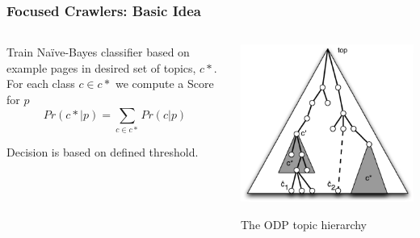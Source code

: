 \documentclass{beamer}
\begin{document}
\begin{frame} \frametitle{Focused Crawlers: Basic Idea}


\begin{columns}
\begin{column}{0.7\textwidth}

Train Na\"ive-Bayes classifier based on example pages in desired set of
topics, $c*$. For each class $c \in c*$ we compute a Score
for $p$ 
\begin{equation*}
Pr(c*|p) = \sum_{c \in c*} Pr(c|p)
\end{equation*}

Decision is based on defined threshold.
\end{column}
\begin{column}{0.3\textwidth}

\begin{center}
     \includegraphics[width=\textwidth]{ODP}

The ODP topic hierarchy
\end{center}

\end{column}

\end{columns}

\end{frame}


\end{document}

